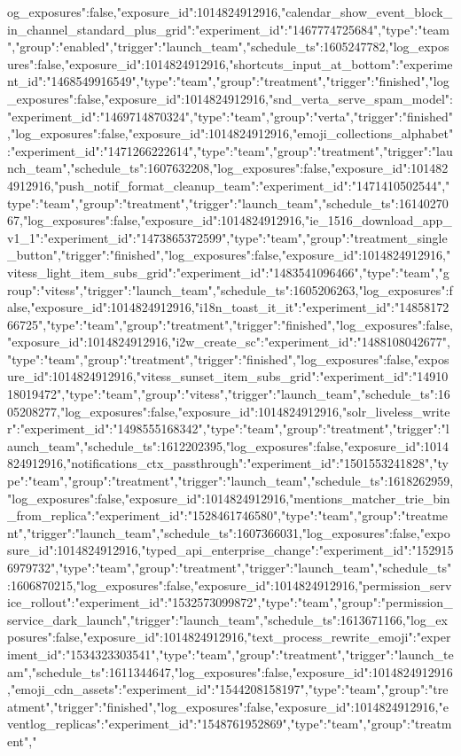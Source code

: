 {og_exposures":false,"exposure_id":1014824912916},"calendar_show_event_block_in_channel_standard_plus_grid":{"experiment_id":"1467774725684","type":"team","group":"enabled","trigger":"launch_team","schedule_ts":1605247782,"log_exposures":false,"exposure_id":1014824912916},"shortcuts_input_at_bottom":{"experiment_id":"1468549916549","type":"team","group":"treatment","trigger":"finished","log_exposures":false,"exposure_id":1014824912916},"snd_verta_serve_spam_model":{"experiment_id":"1469714870324","type":"team","group":"verta","trigger":"finished","log_exposures":false,"exposure_id":1014824912916},"emoji_collections_alphabet":{"experiment_id":"1471266222614","type":"team","group":"treatment","trigger":"launch_team","schedule_ts":1607632208,"log_exposures":false,"exposure_id":1014824912916},"push_notif_format_cleanup_team":{"experiment_id":"1471410502544","type":"team","group":"treatment","trigger":"launch_team","schedule_ts":1614027067,"log_exposures":false,"exposure_id":1014824912916},"ie_1516_download_app_v1_1":{"experiment_id":"1473865372599","type":"team","group":"treatment_single_button","trigger":"finished","log_exposures":false,"exposure_id":1014824912916},"vitess_light_item_subs_grid":{"experiment_id":"1483541096466","type":"team","group":"vitess","trigger":"launch_team","schedule_ts":1605206263,"log_exposures":false,"exposure_id":1014824912916},"i18n_toast_it_it":{"experiment_id":"1485817266725","type":"team","group":"treatment","trigger":"finished","log_exposures":false,"exposure_id":1014824912916},"i2w_create_sc":{"experiment_id":"1488108042677","type":"team","group":"treatment","trigger":"finished","log_exposures":false,"exposure_id":1014824912916},"vitess_sunset_item_subs_grid":{"experiment_id":"1491018019472","type":"team","group":"vitess","trigger":"launch_team","schedule_ts":1605208277,"log_exposures":false,"exposure_id":1014824912916},"solr_liveless_writer":{"experiment_id":"1498555168342","type":"team","group":"treatment","trigger":"launch_team","schedule_ts":1612202395,"log_exposures":false,"exposure_id":1014824912916},"notifications_ctx_passthrough":{"experiment_id":"1501553241828","type":"team","group":"treatment","trigger":"launch_team","schedule_ts":1618262959,"log_exposures":false,"exposure_id":1014824912916},"mentions_matcher_trie_bin_from_replica":{"experiment_id":"1528461746580","type":"team","group":"treatment","trigger":"launch_team","schedule_ts":1607366031,"log_exposures":false,"exposure_id":1014824912916},"typed_api_enterprise_change":{"experiment_id":"1529156979732","type":"team","group":"treatment","trigger":"launch_team","schedule_ts":1606870215,"log_exposures":false,"exposure_id":1014824912916},"permission_service_rollout":{"experiment_id":"1532573099872","type":"team","group":"permission_service_dark_launch","trigger":"launch_team","schedule_ts":1613671166,"log_exposures":false,"exposure_id":1014824912916},"text_process_rewrite_emoji":{"experiment_id":"1534323303541","type":"team","group":"treatment","trigger":"launch_team","schedule_ts":1611344647,"log_exposures":false,"exposure_id":1014824912916},"emoji_cdn_assets":{"experiment_id":"1544208158197","type":"team","group":"treatment","trigger":"finished","log_exposures":false,"exposure_id":1014824912916},"eventlog_replicas":{"experiment_id":"1548761952869","type":"team","group":"treatment","}
